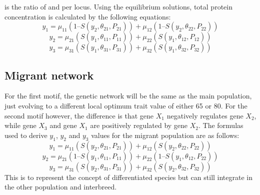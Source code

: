 \textit{\textmu} is the ratio of \textalpha and \textgamma per locus. Using the equilibrium solutions, total protein concentration is calculated by the following equations:
\begin{equation*}
    y_1 = \mu_{11}(1 – S(y_2, \theta_{21}, P_{21})) + \mu_{12}(1 – S(y_{2}, \theta_{22}, P_{22})) \label{eq:y1 function} \tag{5.1}
\end{equation*}
\begin{equation*}
    y_2 = \mu_{21}(S(y_{1}, \theta_{11}, P_{11})) + \mu_{22}(S(y_{1}, \theta_{12}, P_{12})) \label{eq:y2 function} \tag{5.2}
\end{equation*}
\begin{equation*}
    y_3 = \mu_{31}(S(y_{1}, \theta_{31}, P_{31})) + \mu_{32}(S(y_{1}, \theta_{32}, P_{32})) \label{eq:y3 function} \tag{5.3}
\end{equation*}
\subsection{Migrant network}
For the first motif, the genetic network will be the same as the main population, just evolving to a different local optimum trait value of either 65 or 80. For the second motif however, the difference is that gene $X_1$ negatively regulates gene $X_2$, while gene $X_3$ and gene $X_1$ are positively regulated by gene $X_2$. The formulas used to derive $y_1$, $y_2$ and $y_3$ values for the migrant population are as follows:
\begin{equation*}
    y_1 = \mu_{11}(S(y_2, \theta_{21}, P_{21})) + \mu_{12}(S(y_2, \theta_{22}, P_{22})) \label{eq:y1 function} \tag{6.1}
\end{equation*}
\begin{equation*}
    y_2 = \mu_{21}(1 – S(y_1, \theta_{11}, P_{11})) + \mu_{22}(1 – S(y_1, \theta_{12}, P_{22})) \label{eq:y2 function} \tag{6.2}
\end{equation*}
\begin{equation*}
    y_3 = \mu_{31}(S(y_2, \theta_{31}, P_{31})) + \mu_{32}(S(y_2, \theta_{32}, P_{32})) \label{eq:y3 function} \tag{6.3}
\end{equation*}
This is to represent the concept of differentiated species but can still integrate in the other population and interbreed.
